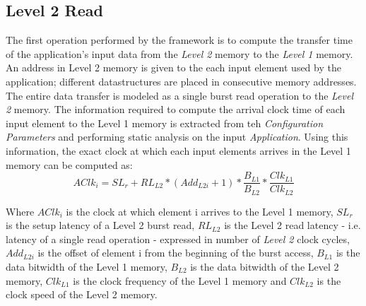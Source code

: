 \subsection{Level 2 Read}
\label{ssec:l2_read_model}
The first operation performed by the framework is to compute the transfer time of the application's input data from the \textit{Level 2} memory to the \textit{Level 1} memory. An address in Level 2 memory is given to the each input element used by the application; different datastructures are placed in consecutive memory addresses. The entire data transfer is modeled as a single burst read operation to the \textit{Level 2} memory. The information required to compute the arrival clock time of each input element to the Level 1 memory is extracted from teh \textit{Configuration Parameters} and performing static analysis on the input \textit{Application}.
Using this information, the exact clock at which each input elements arrives in the Level 1 memory can be computed as:
$$
AClk_i = SL_r + RL_{L2} * (Add_{L2i}+1) * \frac{B_{L1}}{B_{L2}} * \frac{Clk_{L1}}{Clk_{L2}}
$$

Where $AClk_i$ is the clock at which element i arrives to the Level 1 memory, $SL_r$ is the setup latency of a Level 2 burst read, $RL_{L2}$ is the Level 2 read latency - i.e. latency of a single read operation - expressed in number of \textit{Level 2} clock cycles, $Add_{L2i}$ is the offset of element i from the beginning of the burst access, $B_{L1}$ is the data bitwidth of the Level 1 memory, $B_{L2}$ is the data bitwidth of the Level 2 memory, $Clk_{L1}$ is the clock frequency of the Level 1 memory and $Clk_{L2}$ is the clock speed of the Level 2 memory.

